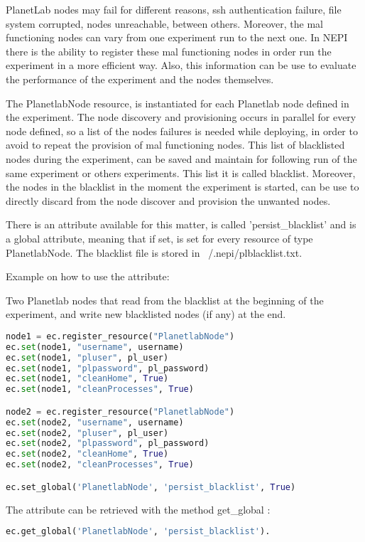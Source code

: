 PlanetLab nodes may fail for different reasons, ssh authentication failure, file system corrupted, nodes unreachable, between others. Moreover, the mal functioning nodes can vary from one experiment run to the next one. In NEPI there is the ability to register these mal functioning nodes in order run the experiment in a more efficient way. Also, this information can be use to evaluate the performance of the experiment and the nodes themselves.

The PlanetlabNode resource, is instantiated for each Planetlab node defined in the experiment. The node discovery and provisioning occurs in parallel for every node defined, so a list of the nodes failures is needed while deploying, in order to avoid to repeat the provision of mal functioning nodes. This list of blacklisted nodes during the experiment, can be saved and maintain for following run of the same experiment or others experiments. This list it is called blacklist. Moreover, the nodes in the blacklist in the moment the experiment is started, can be use to directly discard from the node discover and provision the unwanted nodes.

There is an attribute available for this matter, is called 'persist\_blacklist' and is a global attribute, meaning that if set, is set for every resource of type PlanetlabNode.
The blacklist file is stored in ~/.nepi/plblacklist.txt.

Example on how to use the attribute:

Two Planetlab nodes that read from the blacklist at the beginning of the experiment, and write new blacklisted nodes (if any) at the end.
\begin{lstlisting}[language=Python]
node1 = ec.register_resource("PlanetlabNode")
ec.set(node1, "username", username)
ec.set(node1, "pluser", pl_user)
ec.set(node1, "plpassword", pl_password)
ec.set(node1, "cleanHome", True)
ec.set(node1, "cleanProcesses", True)

node2 = ec.register_resource("PlanetlabNode")
ec.set(node2, "username", username)
ec.set(node2, "pluser", pl_user)
ec.set(node2, "plpassword", pl_password)
ec.set(node2, "cleanHome", True)
ec.set(node2, "cleanProcesses", True)

ec.set_global('PlanetlabNode', 'persist_blacklist', True)
\end{lstlisting}
The attribute can be retrieved with the method get\_global :
\begin{lstlisting}[language=Python]
ec.get_global('PlanetlabNode', 'persist_blacklist').
\end{lstlisting}
